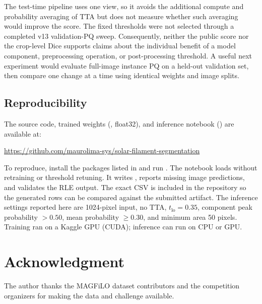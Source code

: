 \documentclass[sigconf,nonacm]{acmart}
\begin{document}
The test-time pipeline uses one view, so it avoids the additional
compute and probability averaging of TTA but does not measure
whether such averaging would improve the score. The fixed thresholds
were not selected through a completed v13 validation-PQ sweep.
Consequently, neither the public score nor the crop-level Dice
supports claims about the individual benefit of a model component,
preprocessing operation, or post-processing threshold. A useful
next experiment would evaluate full-image instance PQ on a held-out
validation set, then compare one change at a time using identical
weights and image splits.

\subsection{Reproducibility}

The source code, trained weights (,
float32), and inference notebook () are
available at:

\begin{center}
\url{https://github.com/maurolima-sys/solar-filament-segmentation}
\end{center}

To reproduce, install the packages listed in
 and run . The notebook
loads  without retraining or threshold
retuning. It writes , reports missing
image predictions, and validates the RLE output. The exact CSV is
included in the repository so the generated rows can be compared
against the submitted artifact. The inference settings reported
here are 1024-pixel input, no TTA, $t_{\mathrm{lo}}=0.35$,
component peak probability $>0.50$, mean probability $\geq0.30$,
and minimum area 50 pixels. Training ran on a Kaggle GPU (CUDA);
inference can run on CPU or GPU.

\section{Acknowledgment}

The author thanks the MAGFiLO dataset contributors and the
competition organizers for making the data and challenge available.
\end{document}
